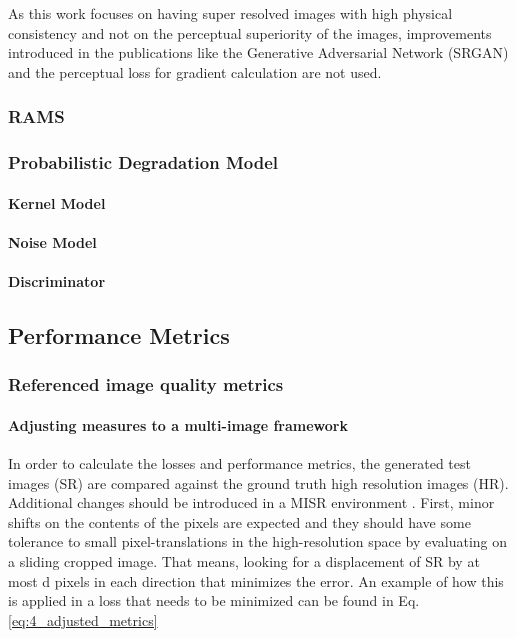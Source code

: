         As this work focuses on having super resolved images with high physical consistency and not on the perceptual superiority of the images, improvements introduced in the publications like the Generative Adversarial Network (SRGAN)  and the perceptual loss for gradient calculation are not used.
    

        \subsubsection{RAMS}
        \subsubsection{Probabilistic Degradation Model}

            \paragraph{Kernel Model}
            \paragraph{Noise Model}
            \paragraph{Discriminator}


    \subsection{Performance Metrics}

        \subsubsection{Referenced image quality metrics}

        
        
    
            \paragraph{Adjusting measures to a multi-image framework}
    
            In order to calculate the losses and performance metrics, the generated test images (SR) are compared against the ground truth high resolution images (HR). Additional changes should be introduced in a MISR environment \cite{martens2019superresolution}. First, minor shifts on the contents of the pixels are expected and they should have some tolerance to small pixel-translations in the high-resolution space by evaluating on a sliding cropped image. That means, looking for a displacement of SR by at most d pixels in each direction that minimizes the error. An example of how this is applied in a loss that needs to be minimized can be found in Eq. \ref{eq:4_adjusted_metrics}
    
